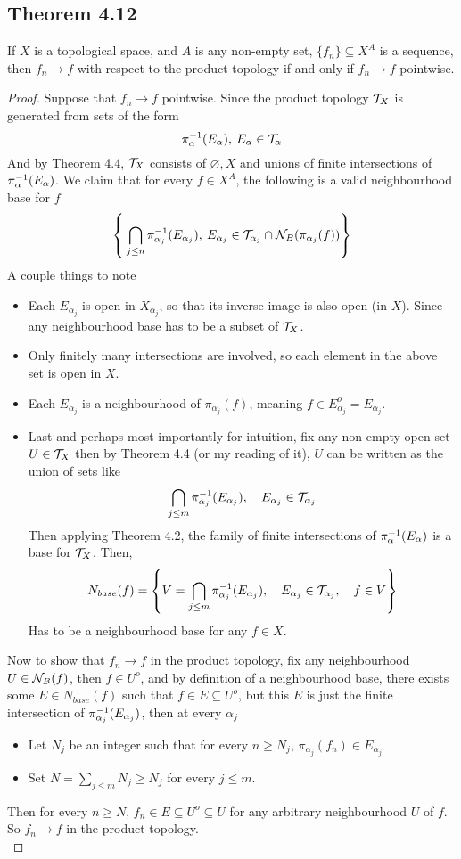 \documentclass[../../main.tex]{subfiles}
\begin{document}
\subsection{Theorem 4.12}
\begin{wts}
If $X$ is a topological space, and $A$ is any non-empty set, $\{f_n\}\subseteq X^A$ is a sequence, then $f_n\to f$ with respect to the product topology if and only if $f_n\to f$ pointwise.
\end{wts}
\begin{proof}
    Suppose that $f_n\to f$ pointwise. Since the product topology $\mathcal{T}_X$ is generated from sets of the form
    \[
    \pi_{\alpha}^{-1}({E_\alpha}),\:E_\alpha\in \mathcal{T}_\alpha
    \]
    And by Theorem 4.4, $\mathcal{T}_X$ consists of $\varnothing, X$ and unions of finite intersections of $\pi_{\alpha}^{-1}({E_\alpha})$. We claim that for every $f\in X^A$, the following is a valid neighbourhood base for $f$
    \[
    \left\{\:\bigcap_{j\leq n}\pi^{-1}_{\alpha_j}(E_{\alpha_j}),\:E_{\alpha_j}\in \mathcal{T}_{\alpha_j}\cap\mathcal{N}_B({\pi_{\alpha_j}(f)})\right\}
    \]
    A couple things to note
    \begin{itemize}
        \item Each $E_{\alpha_j}$ is open in $X_{\alpha_j}$, so that its inverse image is also open (in $X$). Since any neighbourhood base has to be a subset of $\mathcal{T}_X$.
        \item Only finitely many intersections are involved, so each element in the above set is open in $X$.
        \item Each $E_{\alpha_j}$ is a neighbourhood of $\pi_{\alpha_j}(f)$, meaning $f\in E_{\alpha_j}^o = E_{\alpha_j}$.
        \item Last and perhaps most importantly for intuition, fix any non-empty open set $U\in \mathcal{T}_X$ then by Theorem 4.4 (or my reading of it), $U$ can be written as the union of sets like
        \[
        \bigcap_{j\leq m}\pi_{\alpha_j}^{-1}({E_{\alpha_j}}),\quad E_{\alpha_j}\in\mathcal{T}_{\alpha_j}
        \]
        Then applying Theorem 4.2, the family of finite intersections of $\pi_{\alpha}^{-1}({E_\alpha})$ is a base for $\mathcal{T}_X$. Then, 
        \[
        N_{base}(f) = \left\{V=\bigcap_{j\leq m}\pi_{\alpha_j}^{-1}({E_{\alpha_j}}),\quad E_{\alpha_j}\in\mathcal{T}_{\alpha_j}, \quad f\in V\right\}
        \]
        Has to be a neighbourhood base for any $f\in X$.
    \end{itemize}
    Now to show that $f_n\to f$ in the product topology, fix any neighbourhood $U\in\mathcal{N}_B({f})$, then $f\in U^o$, and by definition of a neighbourhood base, there exists some $E\in N_{base}(f)$ such that $f\in E\subseteq U^o$, but this $E$ is just the finite intersection of $\pi_{\alpha_j}^{-1}({E_{\alpha_j}})$, then at every $\alpha_j$
    \begin{itemize}
        \item Let $N_j$ be an integer such that for every $n\geq N_j$, $\pi_{\alpha_j}(f_n)\in E_{\alpha_j}$
        \item Set $N = \sum_{j\leq m}N_j\geq N_j$ for every $j\leq m$.
    \end{itemize}
    Then for every $n\geq N$, $f_n\in E\subseteq U^o\subseteq U$ for any arbitrary neighbourhood $U$ of $f$. So $f_n\to f$ in the product topology.\\
    

\end{proof}
\end{document}
